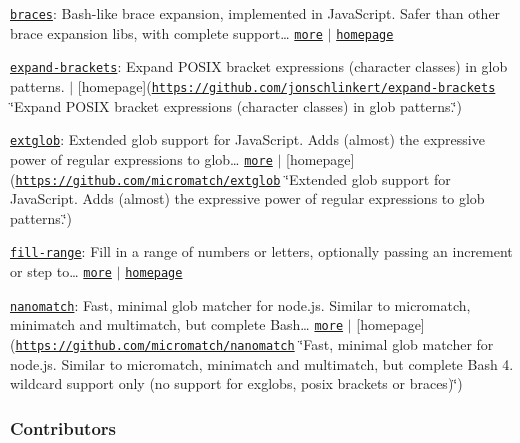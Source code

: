 {\itshape 
\begin{DoxyItemize}
\item \href{https://www.npmjs.com/package/braces}{\tt braces}\+: Bash-\/like brace expansion, implemented in Java\+Script. Safer than other brace expansion libs, with complete support… \href{https://github.com/micromatch/braces}{\tt more} $\vert$ \href{https://github.com/micromatch/braces}{\tt homepage}
\item \href{https://www.npmjs.com/package/expand-brackets}{\tt expand-\/brackets}\+: Expand P\+O\+S\+IX bracket expressions (character classes) in glob patterns. $\vert$ \mbox{[}homepage\mbox{]}(\href{https://github.com/jonschlinkert/expand-brackets}{\tt https\+://github.\+com/jonschlinkert/expand-\/brackets} \char`\"{}\+Expand P\+O\+S\+I\+X bracket expressions (character classes) in glob patterns.\char`\"{})
\item \href{https://www.npmjs.com/package/extglob}{\tt extglob}\+: Extended glob support for Java\+Script. Adds (almost) the expressive power of regular expressions to glob… \href{https://github.com/micromatch/extglob}{\tt more} $\vert$ \mbox{[}homepage\mbox{]}(\href{https://github.com/micromatch/extglob}{\tt https\+://github.\+com/micromatch/extglob} \char`\"{}\+Extended glob support for Java\+Script. Adds (almost) the expressive power of regular expressions to glob patterns.\char`\"{})
\item \href{https://www.npmjs.com/package/fill-range}{\tt fill-\/range}\+: Fill in a range of numbers or letters, optionally passing an increment or {\ttfamily step} to… \href{https://github.com/jonschlinkert/fill-range}{\tt more} $\vert$ \href{https://github.com/jonschlinkert/fill-range}{\tt homepage}
\item \href{https://www.npmjs.com/package/nanomatch}{\tt nanomatch}\+: Fast, minimal glob matcher for node.\+js. Similar to micromatch, minimatch and multimatch, but complete Bash… \href{https://github.com/micromatch/nanomatch}{\tt more} $\vert$ \mbox{[}homepage\mbox{]}(\href{https://github.com/micromatch/nanomatch}{\tt https\+://github.\+com/micromatch/nanomatch} \char`\"{}\+Fast, minimal glob matcher for node.\+js. Similar to micromatch, minimatch and multimatch, but complete Bash 4. wildcard support only (no support for exglobs, posix brackets or braces)\char`\"{})
\end{DoxyItemize}}

{\itshape \subsubsection*{Contributors}}

